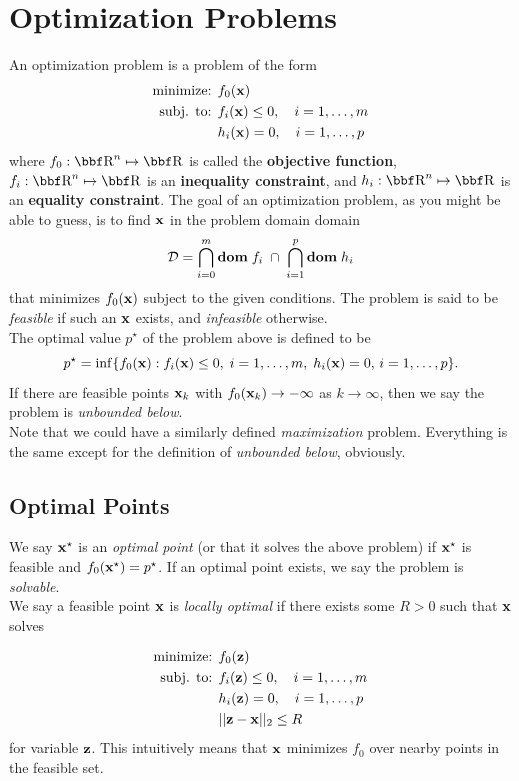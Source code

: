 \documentclass{article}
\begin{document}
\section{Optimization Problems}

An optimization problem is a problem of the form
\begin{align*}
    \text{minimize: } & f_0({\bf x})\\
    \text{subj. to: } & f_i({\bf x}) \leq 0, \quad i=1,\dots,m\\
                      & h_i({\bf x}) = 0, \quad i=1,\dots,p
\end{align*}
where $f_0 : \RR^n \mapsto \RR$ is called the \textbf{objective function},
$f_i : \RR^n \mapsto \RR$ is an \textbf{inequality constraint}, and
$h_i : \RR^n \mapsto \RR$ is an \textbf{equality constraint}. The goal of
an optimization problem, as you might be able to guess, is to find ${\bf x}$ in
the problem domain domain 
\[
    {\cal D} = \bigcap_{i=0}^m\mathbf{dom}\; f_i \;\cap\; \bigcap_{i=1}^p \mathbf{dom}\; h_i
\]
that minimizes $f_0({\bf x})$ subject to the given conditions. The problem is
said to be \textit{feasible} if such an ${\bf x}$ exists, and \textit{infeasible}
otherwise.\\

The optimal value $p^\star$ of the problem above is defined to be
\[
    p^\star = \inf\{f_0({\bf x}) : f_i({\bf x}) \leq 0,\; i=1,\dots,m,\; h_i({\bf x})=0,\, i=1,\dots,p\}.
\]
If there are feasible points ${\bf x}_k$ with $f_0({\bf x}_k)\to -\infty$ as
$k\to\infty$, then we say the problem is \textit{unbounded below}.\\

Note that we could have a similarly defined \textit{maximization} problem.
Everything is the same except for the definition of \textit{unbounded below},
obviously.

\subsection{Optimal Points}

We say ${\bf x}^\star$ is an \textit{optimal point} (or that it solves the
above problem) if ${\bf x}^\star$ is feasible and $f_0({\bf x}^\star)=p^\star$.
If an optimal point exists, we say the problem is \textit{solvable}.\\

We say a feasible point ${\bf x}$ is \textit{locally optimal} if there exists
some $R > 0$ such that ${\bf x}$ solves

\begin{align*}
    \text{minimize: } & f_0({\bf z})\\
    \text{subj. to: } & f_i({\bf z}) \leq 0, \quad i=1,\dots,m\\
                      & h_i({\bf z}) = 0, \quad i=1,\dots,p\\
                      & || {\bf z} - {\bf x} ||_2 \leq R
\end{align*}
for variable ${\bf z}$. This intuitively means that ${\bf x}$ minimizes
$f_0$ over nearby points in the feasible set.
\end{document}
